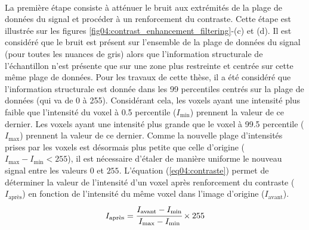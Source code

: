 			\paragraph{}La première étape consiste à atténuer le bruit aux extrémités de la plage de données du signal et procéder à un renforcement du contraste. Cette étape est illustrée sur les figures \ref{fig04:contrast_enhancement_filtering}-(c) et (d). Il est considéré que le bruit est présent sur l'ensemble de la plage de données du signal (pour toutes les nuances de gris) alors que l'information structurale de l'échantillon n'est présente que sur une zone plus restreinte et centrée sur cette même plage de données. Pour les travaux de cette thèse, il a été considéré que l'information structurale est donnée dans les \num{99} percentiles centrés sur la plage de données (qui va de \num{0} à \num{255}). Considérant cela, les voxels ayant une intensité plus faible que l'intensité du voxel à \num{0.5} percentile ($I_\textrm{min}$) prennent la valeur de ce dernier. Les voxels ayant une intensité plus grande que le voxel à \num{99.5} percentile ($I_\textrm{max}$) prennent la valeur de ce dernier. Comme la nouvelle plage d'intensités prises par les voxels est désormais plus petite que celle d'origine ($I_\textrm{max}-I_\textrm{min} < 255$), il est nécessaire d'étaler de manière uniforme le nouveau signal entre les valeurs $0$ et $255$. L'équation (\ref{eq04:contraste}) permet de déterminer la valeur de l'intensité d'un voxel après renforcement du contraste ($I_\textrm{après}$) en fonction de l'intensité du même voxel dans l'image d'origine ($I_\textrm{avant}$).
			\begin{equation}\label{eq04:contraste}
			I_\textrm{après} = \cfrac{I_\textrm{avant} - I_\textrm{min}}{I_\textrm{max} - I_\textrm{min}}\times 255
			\end{equation}
